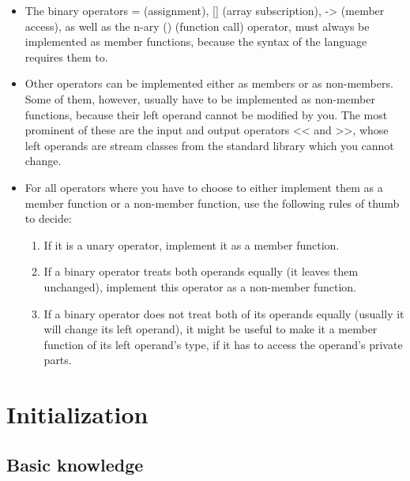 \documentclass[a4paper,11pt,twoside]{book}
\begin{document}
\begin{itemize}
	\item The binary operators = (assignment), [] (array subscription), -> (member access), as well as the n-ary () (function call) operator, must always be implemented as member functions, because the syntax of the language requires them to.
	
	\item Other operators can be implemented either as members or as non-members. Some of them, however, usually have to be implemented as non-member functions, because their left operand cannot be modified by you. The most prominent of these are the input and output operators << and >>, whose left operands are stream classes from the standard library which you cannot change.
	
	\item For all operators where you have to choose to either implement them as a member function or a non-member function, use the following rules of thumb to decide:
	\begin{enumerate}
		\item If it is a unary operator, implement it as a member function.
		
		\item If a binary operator treats both operands equally (it leaves them unchanged), implement this operator as a non-member function.
		
		\item If a binary operator does not treat both of its operands equally (usually it will change its left operand), it might be useful to make it a member function of its left operand’s type, if it has to access the operand's private parts.
	\end{enumerate}
	
\end{itemize}


\chapter{Initialization}
\section{Basic knowledge}
\end{document}
